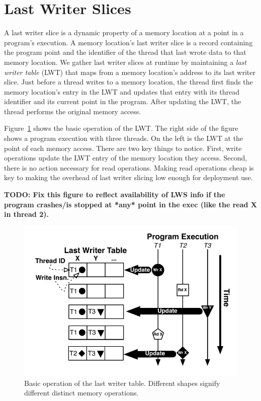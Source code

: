 \documentclass[preprint,9pt]{sigplanconf}
\newcommand{\lwt}{LWT\xspace}
\begin{document}
\section{Last Writer Slices}
\label{sec:lastwriterslices}
A last writer slice is a dynamic property of a memory location at a point in a
program's execution.   A memory location's last writer slice is a record
containing the program point and the identifier of the thread that last wrote
data to that memory location.  We gather last writer slices at runtime by
maintaining a {\em last writer table} (\lwt) that maps from a memory
location's address to its last writer slice.  Just before a thread writes to a
memory location,  the thread first finds the memory location's entry in the
\lwt and updates that entry with its thread identifier and its current point in the
program.  After updating the \lwt, the thread performs the original memory
access.

Figure~\ref{fig:basicLWT} shows the basic operation of the \lwt.  The right
side of the figure shows a program execution with three threads.  On the left
is the \lwt at the point of each memory access.  There are two key things to
notice.  First, write operations update the \lwt entry of the memory location
they access.  Second, there is no action necessary for read operations.
Making read operations cheap is key to making the overhead of last writer
slicing low enough for deployment use.

{\bf TODO: Fix this figure to reflect availability of LWS info if the program crashes/is stopped at *any* point in the exec (like the read X in thread 2).}

\begin{figure}[h]
\centering
\includegraphics[scale=.6]{figs/BasicLWT.pdf}
\caption{\label{fig:basicLWT}Basic operation of the last writer table. Different shapes signify different distinct memory operations. }
\end{figure}
\end{document}
